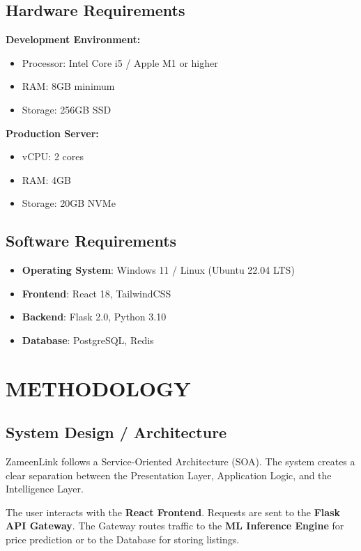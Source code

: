 \documentclass[12pt,a4paper]{report}
\begin{document}
\section{Hardware Requirements}
\textbf{Development Environment:}
\begin{itemize}
    \item Processor: Intel Core i5 / Apple M1 or higher
    \item RAM: 8GB minimum
    \item Storage: 256GB SSD
\end{itemize}

\textbf{Production Server:}
\begin{itemize}
    \item vCPU: 2 cores
    \item RAM: 4GB
    \item Storage: 20GB NVMe
\end{itemize}

\section{Software Requirements}
\begin{itemize}
    \item \textbf{Operating System}: Windows 11 / Linux (Ubuntu 22.04 LTS)
    \item \textbf{Frontend}: React 18, TailwindCSS
    \item \textbf{Backend}: Flask 2.0, Python 3.10
    \item \textbf{Database}: PostgreSQL, Redis
\end{itemize}

\chapter{METHODOLOGY}

\section{System Design / Architecture}
ZameenLink follows a Service-Oriented Architecture (SOA). The system creates a clear separation between the Presentation Layer, Application Logic, and the Intelligence Layer.

The user interacts with the \textbf{React Frontend}. Requests are sent to the \textbf{Flask API Gateway}. The Gateway routes traffic to the \textbf{ML Inference Engine} for price prediction or to the Database for storing listings.
\end{document}
